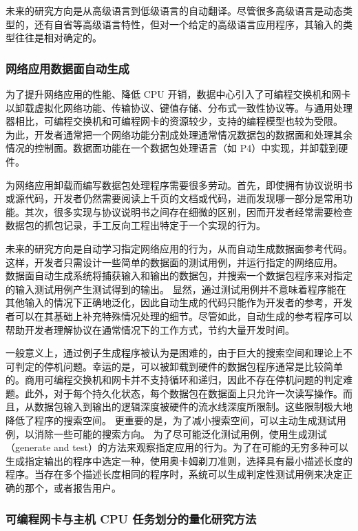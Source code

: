 未来的研究方向是从高级语言到低级语言的自动翻译。尽管很多高级语言是动态类型的，还有自省等高级语言特性，但对一个给定的高级语言应用程序，其输入的类型往往是相对确定的。
\fi

\subsubsection{网络应用数据面自动生成}
\label{future:p4coder}

为了提升网络应用的性能、降低 CPU 开销，数据中心引入了可编程交换机和网卡以卸载虚拟化网络功能、传输协议、键值存储、分布式一致性协议等。与通用处理器相比，可编程交换机和可编程网卡的资源较少，支持的编程模型也较为受限。
为此，开发者通常把一个网络功能分割成处理通常情况数据包的数据面和处理其余情况的控制面。数据面功能在一个数据包处理语言（如 P4）中实现，并卸载到硬件。

为网络应用卸载而编写数据包处理程序需要很多劳动。首先，即使拥有协议说明书或源代码，开发者仍然需要阅读上千页的文档或代码，进而发现哪一部分是常用功能。其次，很多实现与协议说明书之间存在细微的区别，因而开发者经常需要检查数据包的抓包记录，手工反向工程出特定于一个实现的行为。

未来的研究方向是自动学习指定网络应用的行为，从而自动生成数据面参考代码。
这样，开发者只需设计一些简单的数据面的测试用例，并运行指定的网络应用。
数据面自动生成系统将捕获输入和输出的数据包，并搜索一个数据包程序来对指定的输入测试用例产生测试得到的输出。
显然，通过测试用例并不意味着程序能在其他输入的情况下正确地泛化，因此自动生成的代码只能作为开发者的参考，开发者可以在其基础上补充特殊情况处理的细节。尽管如此，自动生成的参考程序可以帮助开发者理解协议在通常情况下的工作方式，节约大量开发时间。


一般意义上，通过例子生成程序被认为是困难的，由于巨大的搜索空间和理论上不可判定的停机问题。幸运的是，可以被卸载到硬件的数据包程序通常是比较简单的。商用可编程交换机和网卡并不支持循环和递归，因此不存在停机问题的判定难题。此外，对于每个持久化状态，每个数据包在数据面上只允许一次读写操作。而且，从数据包输入到输出的逻辑深度被硬件的流水线深度所限制。这些限制极大地降低了程序的搜索空间。
更重要的是，为了减小搜索空间，可以主动生成测试用例，以消除一些可能的搜索方向。
为了尽可能泛化测试用例，使用生成测试（generate and test）的方法来观察指定应用的行为。为了在可能的无穷多种可以生成指定输出的程序中选定一种，使用奥卡姆剃刀准则，选择具有最小描述长度的程序。当存在多个描述长度相同的程序时，系统可以生成判定性测试用例来决定正确的那个，或者报告用户。



\subsubsection{可编程网卡与主机 CPU 任务划分的量化研究方法}
\label{future:work-split}




